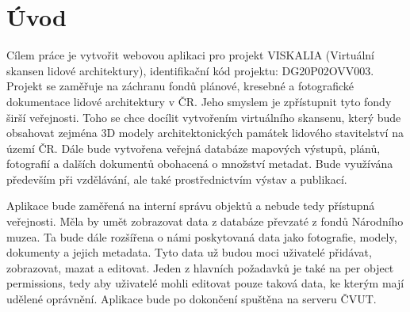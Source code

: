 \chapter*{Úvod}
\label{0-uvod}


Cílem práce je vytvořit webovou aplikaci pro projekt VISKALIA
(Virtuální skansen lidové architektury), identifikační kód projektu:
DG20P02OVV003. Projekt se zaměřuje na záchranu fondů plánové, kresebné
a fotografické dokumentace lidové architektury v ČR. Jeho smyslem je
zpřístupnit tyto fondy širší veřejnosti. Toho se chce docílit
vytvořením virtuálního skansenu, který bude obsahovat zejména 3D
modely architektonických památek lidového stavitelství na území
ČR. Dále bude vytvořena veřejná databáze mapových výstupů, plánů,
fotografií a dalších dokumentů obohacená o množství metadat. Bude
využívána především při vzdělávání, ale také prostřednictvím výstav a
publikací.

Aplikace bude zaměřená na interní správu objektů a nebude tedy přístupná
veřejnosti. Měla by umět zobrazovat data z databáze převzaté
z fondů Národního muzea. Ta bude dále rozšířena o námi poskytovaná
data jako fotografie, modely, dokumenty a jejich metadata. Tyto data
už budou moci uživatelé přidávat, zobrazovat, mazat a editovat. Jeden
z hlavních požadavků je také na per object permissions, tedy aby
uživatelé mohli editovat pouze taková data, ke kterým mají udělené
oprávnění. Aplikace bude po dokončení spuštěna na serveru ČVUT.



